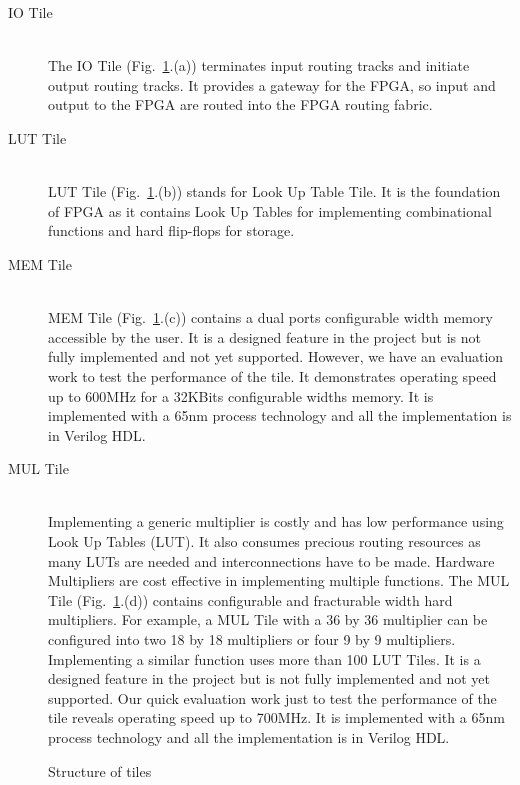 \begin{description}
  \item[IO Tile] \hfill \\
  The IO Tile (Fig.~\ref{fig:inside_tiles}.(a)) terminates input routing tracks and initiate output routing tracks. It provides a gateway for the FPGA, so input and output
	to the FPGA are routed into the FPGA routing fabric. \par
	\item[LUT Tile] \hfill \\
  LUT Tile (Fig.~\ref{fig:inside_tiles}.(b)) stands for Look Up Table Tile. It is the foundation of FPGA as it contains Look Up Tables for implementing combinational
	functions and hard flip-flops for storage. \par
  \item[MEM Tile] \hfill \\
  MEM Tile (Fig.~\ref{fig:inside_tiles}.(c)) contains a dual ports configurable width memory accessible by the user. 
	It is a designed feature in the project but is not fully implemented and not yet supported.
	However, we have an evaluation work to test the performance of the tile. It demonstrates operating speed up to 600MHz for a 32KBits configurable widths memory.
	It is implemented with a 65nm process technology and all the implementation is in Verilog HDL. \par
	\item[MUL Tile] \hfill \\
	Implementing a generic multiplier is costly and has low performance using Look Up Tables (LUT). It also consumes precious routing resources as many LUTs are needed and
	interconnections have to be made. Hardware Multipliers are cost effective in implementing multiple functions. The MUL Tile (Fig.~\ref{fig:inside_tiles}.(d)) contains configurable and fracturable
	width hard multipliers. For example, a MUL Tile with a 36 by 36 multiplier can be configured into two 18 by 18 multipliers
	or four 9 by 9 multipliers. Implementing a similar function uses more than 100 LUT Tiles. It is a designed feature in the project but is not fully implemented and not yet supported.
	Our quick evaluation work just to test the performance of the tile reveals operating speed up to 700MHz. 
	It is implemented with a 65nm process technology and all the implementation is in Verilog HDL. \par
\end{description}

\begin{figure}[htp]
	\begin{center}
		\renewcommand{\captionfont}{\small}
		\caption{Structure of tiles}
		\label{fig:inside_tiles}
	\end{center}
\end{figure}

